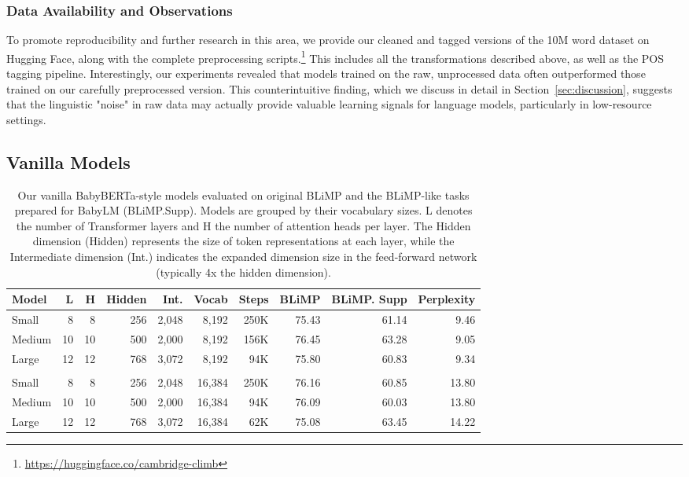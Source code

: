 \subsubsection{Data Availability and Observations}
To promote reproducibility and further research in this area, we provide our cleaned and tagged versions of the 10M word dataset on Hugging Face, along with the complete preprocessing scripts.\footnote{\url{https://huggingface.co/cambridge-climb}} This includes all the transformations described above, as well as the POS tagging pipeline. Interestingly, our experiments revealed that models trained on the raw, unprocessed data often outperformed those trained on our carefully preprocessed version. This counterintuitive finding, which we discuss in detail in Section~\ref{sec:discussion}, suggests that the linguistic "noise" in raw data may actually provide valuable learning signals for language models, particularly in low-resource settings.

\subsection{Vanilla Models}
\label{subsec:baseline}

\begin{table}
\centering
\small
\setlength{\tabcolsep}{4pt}  %
\begin{tabular}{l | rrrrr | rrrr}
\toprule
Model  & L & H & Hidden & Int. & Vocab & Steps & BLiMP & BLiMP. Supp & Perplexity \\
\midrule
Small  & 8 & 8 & 256 & 2,048   & 8,192   & 250K      & 75.43      & 61.14       & 9.46    \\
Medium & 10 & 10 & 500 & 2,000 & 8,192  & 156K      & 76.45      & 63.28        & 9.05  \\
Large  & 12 & 12 & 768 & 3,072 & 8,192   & 94K      & 75.80      & 60.83      & 9.34 \\[2mm]
\hline \\
Small  & 8 & 8 & 256 & 2,048   & 16,384  & 250K      & 76.16      & 60.85       & 13.80    \\
Medium & 10 & 10 & 500 & 2,000  & 16,384 & 94K      & 76.09      & 60.03        & 13.80     \\
Large  & 12 & 12 & 768 & 3,072 & 16,384  & 62K      & 75.08      & 63.45      & 14.22     \\
\bottomrule
\end{tabular}
\caption{\label{tbl:baseline-size-comparison} Our vanilla BabyBERTa-style models evaluated on original BLiMP and the BLiMP-like tasks prepared for BabyLM (BLiMP.Supp). Models are grouped by their vocabulary sizes. L denotes the number of Transformer layers and H the number of attention heads per layer. The Hidden dimension (Hidden) represents the size of token representations at each layer, while the Intermediate dimension (Int.) indicates the expanded dimension size in the feed-forward network (typically 4x the hidden dimension).}
\end{table}

